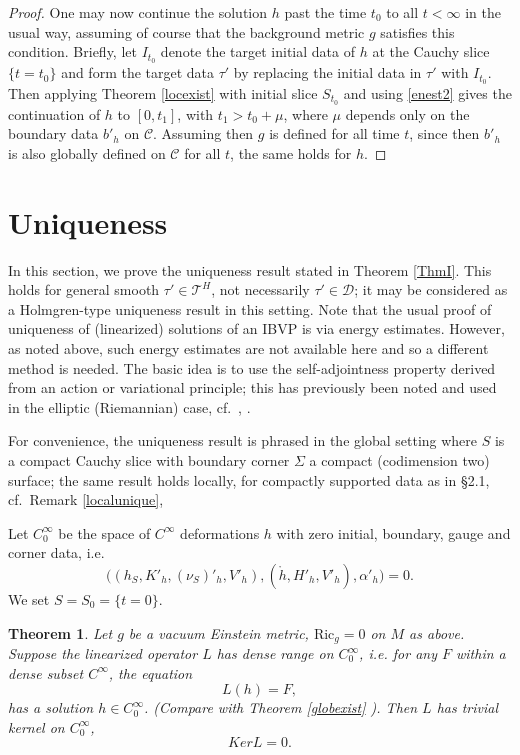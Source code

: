 \documentclass[10pt]{amsart}
\renewcommand{\a}{\alpha}
\newcommand{\Si}{\Sigma}
\newcommand{\cC}{{\mathcal C}}
\newcommand{\cT}{{\mathcal T}}
\newcommand{\cD}{{\mathcal D}}
\newcommand{\Ric}{\mathrm{Ric}}
\newcommand{\be}{\begin{equation}}
\newcommand{\ee}{\end{equation}}
\newcommand{\<}{\langle}
\renewcommand{\>}{\rangle}
\theoremstyle{plain}
\newtheorem{theorem}[lemma]{Theorem}
\theoremstyle{remark}
\theoremstyle{definition}
\numberwithin{equation}{section}
\begin{document}
\begin{proof}
  One may now continue the solution $h$ past the time $t_0$ to all $t < \infty$ in the usual way, assuming of course that the background metric 
$g$ satisfies this condition. Briefly, let $I_{t_0}$ denote the target initial data of $h$ at the Cauchy slice $\{t=t_0\}$ and form the target data 
$\tau'$ by replacing the initial data in $\tau'$ with $I_{t_0}$. Then applying Theorem \ref{locexist} with initial slice $S_{t_0}$ and using \eqref{enest2} 
gives the continuation of $h$ to $[0, t_1]$, with $t_1 > t_0 + \mu$, where $\mu$ depends only on the boundary data $b'_h$ on $\cC$. 
Assuming then $g$ is defined for all time $t$, since then $b'_h$ is also globally defined on $\cC$ for all $t$, the same holds for $h$. 
  
\end{proof}


\section{Uniqueness}

   In this section, we prove the uniqueness result stated in Theorem \ref{ThmI}. This holds for general smooth $\tau' \in \cT^H$, not necessarily 
$\tau' \in \cD$; it may be considered as a Holmgren-type uniqueness result in this setting.  Note that the usual proof of uniqueness of (linearized) solutions 
of an IBVP is via energy estimates. However, as noted above, such energy estimates are not available here and so a different method is needed. 
The basic idea is to use the self-adjointness property derived from an action or variational principle; this has previously been noted and used 
in the elliptic (Riemannian) case, cf.~\cite{A1}, \cite{AK}. 


  For convenience, the uniqueness result is phrased in the global setting where $S$ is a compact Cauchy slice with boundary corner 
$\Si$ a compact (codimension two) surface; the same result holds locally, for compactly supported data as in \S 2.1, cf.~Remark \ref{localunique},

   Let $C^{\infty}_0$ be the space of $C^{\infty}$ deformations $h$ with zero initial, boundary, gauge and corner data, i.e. 
\be \label{zero}
\big((h_S,K'_h, (\nu_S)'_h, V'_h), (\ring{h}, H'_h, V'_h), \a'_h \big) = 0.
\ee
We set $S = S_0 = \{t = 0\}$. 

\begin{theorem}\label{unique}
Let $g$ be a vacuum Einstein metric, $\Ric_g = 0$ on $M$ as above. Suppose the linearized operator $L$ has dense range on $C^{\infty}_0$, i.e. 
for any $F$ within a dense subset $C^{\infty}$, the equation 
$$L(h) = F,$$
has a solution $h \in C_0^{\infty}$. {\rm (}Compare with Theorem \ref{globexist} {\rm )}. Then $L$ has trivial kernel on $C^{\infty}_0$, 
\be \label{KerL}
Ker L = 0.
\ee
\end{theorem}
\end{document}
